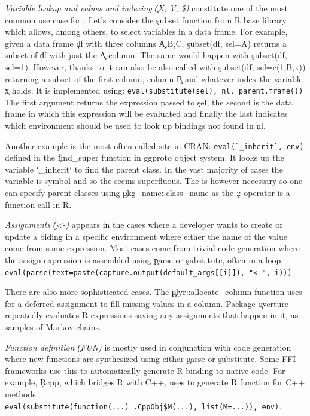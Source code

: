 \documentclass[review,screen,acmsmall,anonymous=true]{acmart}
\begin{document}
\begin{compactitem}[---] 

  \item \emph{Variable lookup and values and indexing \c{(X, V, \$)}}
    constitute one of the most common use case for \eval. Let's consider the
    \c{subset} function from R base library which allows, among others, to
    select variables in a data frame. For example, given a data frame \c{df}
    with three columns \c{A,B,C}, \c{subset(df, sel=A)} returns a subset of
    \c{df} with just the \c{A} column. The same would happen with \c{subset(df,
    sel=1)}. However, thanks to \eval it can also be also called with
    \c{subset(df, sel=c(1,B,x))} returning a subset of the first column, column
    \c{B} and whatever index the variable \c{x} holds. It is implemented using:
    \lstinline|eval(substitute(sel), nl, parent.frame())| The first argument
    returns the expression passed to \c{sel}, the second is the data frame in
    which this expression will be evaluated and finally the last indicates
    which environment should be used to look up bindings not found in \c{nl}.

    Another example is the most often called \eval site in CRAN:
    \lstinline|eval(`_inherit`, env)| defined in the \c{find\_super} function
    in \c{ggproto} object system. It looks up the variable \c{`\_inherit`} to
    find the parent class. In the vast majority of cases the variable is symbol
    and so the \eval seems superfluous. The \eval is however necessary so one
    can specify parent classes using \c{pkg\_name::class\_name} as the \c{::}
    operator is a function call in R.

  \item \emph{Assignments \c{(<-)}} appears in the cases where a developer wants
    to create or update a biding in a specific environment where either the
    name of the value come from some expression. Most cases come from trivial
    code generation where the assign expression is assembled using \c{parse} or
    \c{substitute}, often in a loop: \lstinline|eval(parse(text=paste(capture.output(default_args[[i]]), "<-", i)))|. 

    There are also more sophisticated cases. The \c{plyr::allocate\_column}
    function uses \eval for a deferred assignment to fill missing values in a
    column. Package \c{overture} repeatedly evaluates R expressions saving any
    assignments that happen in it, as samples of Markov chains.
    
  \item \emph{Function definition \c{(FUN)}} is mostly used in conjunction with
    code generation where new functions are synthesized using either \c{parse}
    or \c{substitute}. Some FFI frameworks use this to automatically generate R
    binding to native code. For example, \c{Rcpp}, which bridges R with C++,
    uses \eval to generate R function for C++ methods:\\
    \lstinline|eval(substitute(function(...) .CppObj$M(...), list(M=...)), env)|.


\end{compactitem}
\end{document}
